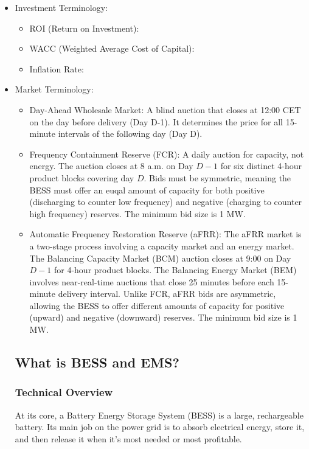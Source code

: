 \begin{itemize}
    \item Investment Terminology:
        \begin{itemize}
            \item ROI (Return on Investment): 
            \item WACC (Weighted Average Cost of Capital): 
            \item Inflation Rate: 
        \end{itemize}   
    \item Market Terminology:
        \begin{itemize}
            \item Day-Ahead Wholesale Market: A blind auction that closes at 12:00 CET on the day before delivery (Day D-1). It determines the price for all 15-minute intervals of the following day (Day D).
            \item Frequency Containment Reserve (FCR): 
            A daily auction for capacity, not energy. The auction closes at 8 a.m. on Day $D-1$ for six distinct 4-hour product blocks covering day $D$. Bids must be symmetric, meaning the BESS must offer an euqal amount of capacity for both positive (discharging to counter low frequency) and negative (charging to counter high frequency) reserves. The minimum bid size is 1 MW. 
            \item Automatic Frequency Restoration Reserve (aFRR): 
            The aFRR market is a two-stage process involving a capacity market and an energy market. The Balancing Capacity Market (BCM) auction closes at 9:00 on Day $D-1$ for 4-hour product blocks. The Balancing Energy Market (BEM) involves near-real-time auctions that close 25 minutes before each 15-minute delivery interval. 
            Unlike FCR, aFRR bids are asymmetric, allowing the BESS to offer different amounts of capacity for positive (upward) and negative (downward) reserves. The minimum bid size is 1 MW.

\end{itemize}

\subsection{What is BESS and EMS?}

\subsubsection{Technical Overview}
At its core, a Battery Energy Storage System (BESS) is a large, rechargeable battery. Its main job on the power grid is to absorb electrical energy, store it, and then release it when it's most needed or most profitable.


\end{itemize}
